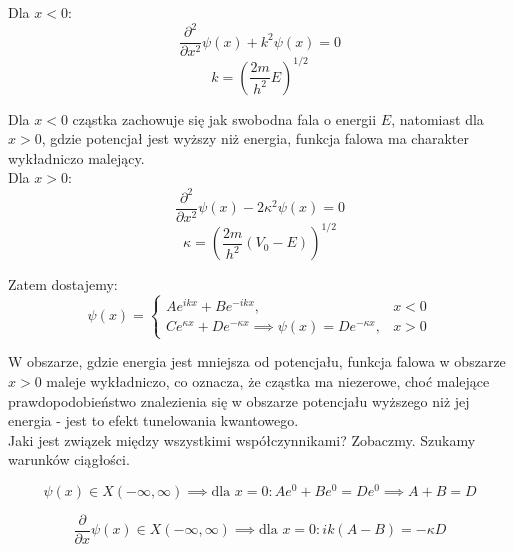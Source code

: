 
Dla $x < 0$:
\begin{equation*}
\frac{\partial^2}{\partial x^2} \psi(x) + k^2 \psi(x) = 0
\end{equation*}
%
\begin{equation*}
k = \left( \frac{2m}{h^2} E \right)^{1/2}
\end{equation*}


Dla $x<0$ cząstka zachowuje się jak swobodna fala o energii $E$, natomiast dla $x>0$,
gdzie potencjał jest wyższy niż energia, funkcja falowa ma charakter wykładniczo malejący. \\

Dla $x > 0$:
\begin{equation*}
\frac{\partial^2}{\partial x^2} \psi(x) - 2 \kappa^2 \psi(x) = 0
\end{equation*}
%
\begin{equation*}
\kappa = \left( \frac{2m}{h^2} (V_0 - E) \right)^{1/2}
\end{equation*}




Zatem dostajemy:
\begin{equation*}
\psi(x) = 
\begin{cases}
    A e^{ikx} + B e^{-ikx}, & x < 0 \\
    C e^{\kappa x} + D e^{-\kappa x} \implies \psi(x) = D e^{-\kappa x}, & x > 0
\end{cases}
\end{equation*}

W obszarze, gdzie energia jest mniejsza od potencjału, funkcja falowa w obszarze $x>0$ maleje wykładniczo,
co oznacza, że cząstka ma niezerowe, choć malejące prawdopodobieństwo znalezienia się w obszarze potencjału
wyższego niż jej energia - jest to efekt tunelowania kwantowego. \\

Jaki jest związek między wszystkimi współczynnikami? Zobaczmy. Szukamy warunków ciągłości.

\begin{equation*}
\psi(x) \in X(-\infty, \infty) \implies \text{dla } x = 0: A e^0 + B e^0 = D e^0 \implies A + B = D
\end{equation*}

\begin{equation*}
\frac{\partial}{\partial x} \psi(x) \in X(-\infty, \infty) \implies \text{dla } x = 0: i k (A - B) = - \kappa D
\end{equation*}

